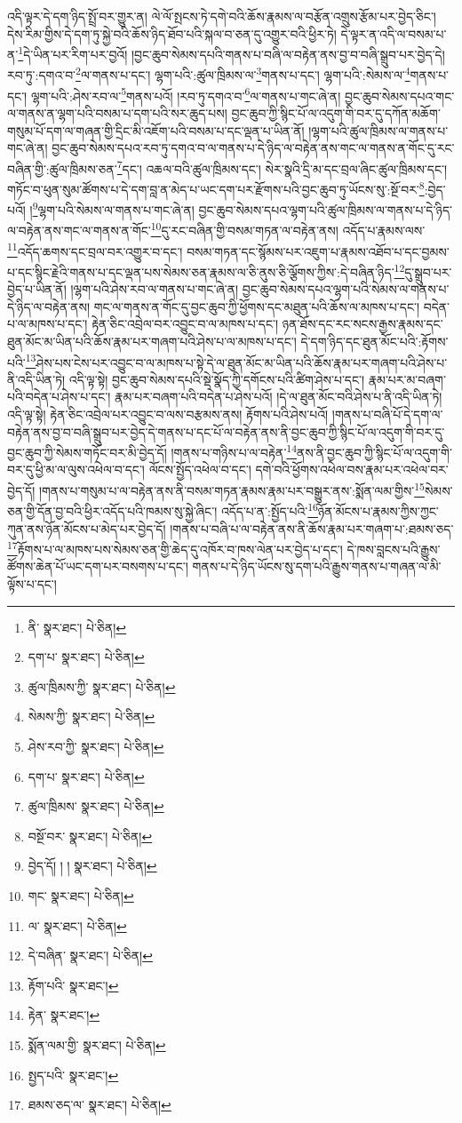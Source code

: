 འདི་ལྟར་དེ་དག་ཉིད་སྤྲོ་བར་གྱུར་ན། ལེ་ལོ་སྤངས་ཏེ་དགེ་བའི་ཆོས་རྣམས་ལ་བརྩོན་འགྲུས་རྩོམ་པར་བྱེད་ཅིང་། དེས་རིམ་གྱིས་དེ་དག་ཏུ་སྐྱེ་བའི་ཆོས་ཉིད་ཐོབ་པའི་སྐལ་བ་ཅན་དུ་འགྱུར་བའི་ཕྱིར་ཏེ། དེ་ལྟར་ན་འདི་ལ་བསམ་པ་ན་\footnote{ནི་  སྣར་ཐང་།  པེ་ཅིན། }དེ་ཡིན་པར་རིག་པར་བྱའོ། །བྱང་ཆུབ་སེམས་དཔའི་གནས་པ་བཞི་ལ་བརྟེན་ནས་བྱ་བ་བཞི་སྒྲུབ་པར་བྱེད་དེ། རབ་ཏུ་:དགའ་བ་\footnote{དག་པ་  སྣར་ཐང་།  པེ་ཅིན། }ལ་གནས་པ་དང་། ལྷག་པའི་:ཚུལ་ཁྲིམས་ལ་\footnote{ཚུལ་ཁྲིམས་ཀྱི་  སྣར་ཐང་།  པེ་ཅིན། }གནས་པ་དང་། ལྷག་པའི་:སེམས་ལ་\footnote{སེམས་ཀྱི་  སྣར་ཐང་།  པེ་ཅིན། }གནས་པ་དང་། ལྷག་པའི་:ཤེས་རབ་ལ་\footnote{ཤེས་རབ་ཀྱི་  སྣར་ཐང་།  པེ་ཅིན། }གནས་པའོ། །རབ་ཏུ་དགའ་བ་\footnote{དག་པ་  སྣར་ཐང་།  པེ་ཅིན། }ལ་གནས་པ་གང་ཞེ་ན། བྱང་ཆུབ་སེམས་དཔའ་གང་ལ་གནས་ན་ལྷག་པའི་བསམ་པ་དག་པའི་སར་ཆུད་པས། བྱང་ཆུབ་ཀྱི་སྙིང་པོ་ལ་འདུག་གི་བར་དུ་དཀོན་མཆོག་གསུམ་པོ་དག་ལ་གཞན་གྱི་དྲིང་མི་འཇོག་པའི་བསམ་པ་དང་ལྡན་པ་ཡིན་ནོ། །ལྷག་པའི་ཚུལ་ཁྲིམས་ལ་གནས་པ་གང་ཞེ་ན། བྱང་ཆུབ་སེམས་དཔའ་རབ་ཏུ་དགའ་བ་ལ་གནས་པ་དེ་ཉིད་ལ་བརྟེན་ནས་གང་ལ་གནས་ན་གོང་དུ་རང་བཞིན་གྱི་:ཚུལ་ཁྲིམས་ཅན་\footnote{ཚུལ་ཁྲིམས་  སྣར་ཐང་།  པེ་ཅིན། }དང་། འཆལ་བའི་ཚུལ་ཁྲིམས་དང་། སེར་སྣའི་དྲི་མ་དང་བྲལ་ཞིང་ཚུལ་ཁྲིམས་དང་། གཏོང་བ་ཕུན་སུམ་ཚོགས་པ་དེ་དག་བླ་ན་མེད་པ་ཡང་དག་པར་རྫོགས་པའི་བྱང་ཆུབ་ཏུ་ཡོངས་སུ་:སྔོ་བར་\footnote{བསྔོ་བར་  སྣར་ཐང་།  པེ་ཅིན། }:བྱེད་པའོ། །\footnote{བྱེད་དོ། ། །  སྣར་ཐང་།  པེ་ཅིན། }ལྷག་པའི་སེམས་ལ་གནས་པ་གང་ཞེ་ན། བྱང་ཆུབ་སེམས་དཔའ་ལྷག་པའི་ཚུལ་ཁྲིམས་ལ་གནས་པ་དེ་ཉིད་ལ་བརྟེན་ནས་གང་ལ་གནས་ན་གོང་\footnote{གང་  སྣར་ཐང་།  པེ་ཅིན། }དུ་རང་བཞིན་གྱི་བསམ་གཏན་ལ་བརྟེན་ནས། འདོད་པ་རྣམས་ལས་\footnote{ལ་  སྣར་ཐང་།  པེ་ཅིན། }འདོད་ཆགས་དང་བྲལ་བར་འགྱུར་བ་དང་། བསམ་གཏན་དང་སྙོམས་པར་འཇུག་པ་རྣམས་འཐོབ་པ་དང་བྱམས་པ་དང་སྙིང་རྗེའི་གནས་པ་དང་ལྡན་པས་སེམས་ཅན་རྣམས་ལ་ཅི་ནུས་ཅི་ལྕོགས་ཀྱིས་:དེ་བཞིན་ཉིད་\footnote{དེ་བཞིན་  སྣར་ཐང་།  པེ་ཅིན། }དུ་སྒྲུབ་པར་བྱེད་པ་ཡིན་ནོ། །ལྷག་པའི་ཤེས་རབ་ལ་གནས་པ་གང་ཞེ་ན། བྱང་ཆུབ་སེམས་དཔའ་ལྷག་པའི་སེམས་ལ་གནས་པ་དེ་ཉིད་ལ་བརྟེན་ནས། གང་ལ་གནས་ན་གོང་དུ་བྱང་ཆུབ་ཀྱི་ཕྱོགས་དང་མཐུན་པའི་ཆོས་ལ་མཁས་པ་དང་། བདེན་པ་ལ་མཁས་པ་དང་། རྟེན་ཅིང་འབྲེལ་བར་འབྱུང་བ་ལ་མཁས་པ་དང་། ཉན་ཐོས་དང་རང་སངས་རྒྱས་རྣམས་དང་ཐུན་མོང་མ་ཡིན་པའི་ཆོས་རྣམ་པར་གཞག་པའི་ཤེས་པ་ལ་མཁས་པ་དང་། དེ་དག་ཉིད་དང་ཐུན་མོང་པའི་:རྟོགས་པའི་\footnote{རྟོག་པའི་  སྣར་ཐང་། }ཤེས་པས་ངེས་པར་འབྱུང་བ་ལ་མཁས་པ་སྟེ་དེ་ལ་ཐུན་མོང་མ་ཡིན་པའི་ཆོས་རྣམ་པར་གཞག་པའི་ཤེས་པ་ནི་འདི་ཡིན་ཏེ། འདི་ལྟ་སྟེ། བྱང་ཆུབ་སེམས་དཔའི་སྡེ་སྣོད་ཀྱི་དགོངས་པའི་ཚིག་ཤེས་པ་དང་། རྣམ་པར་མ་བཞག་པའི་བདེན་པ་ཤེས་པ་དང་། རྣམ་པར་བཞག་པའི་བདེན་པ་ཤེས་པའོ། །དེ་ལ་ཐུན་མོང་བའི་ཤེས་པ་ནི་འདི་ཡིན་ཏེ། འདི་ལྟ་སྟེ། རྟེན་ཅིང་འབྲེལ་པར་འབྱུང་བ་ལས་བརྩམས་ནས། རྟོགས་པའི་ཤེས་པའོ། །གནས་པ་བཞི་པོ་དེ་དག་ལ་བརྟེན་ནས་བྱ་བ་བཞི་སྒྲུབ་པར་བྱེད་དེ་གནས་པ་དང་པོ་ལ་བརྟེན་ནས་ནི་བྱང་ཆུབ་ཀྱི་སྙིང་པོ་ལ་འདུག་གི་བར་དུ་བྱང་ཆུབ་ཀྱི་སེམས་གཏོང་བར་མི་བྱེད་དོ། །གནས་པ་གཉིས་པ་ལ་བརྟེན་\footnote{རྟེན་  སྣར་ཐང་། }ནས་ནི་བྱང་ཆུབ་ཀྱི་སྙིང་པོ་ལ་འདུག་གི་བར་དུ་ཕྱི་མ་ལ་ལུས་འཕེལ་བ་དང་། ལོངས་སྤྱོད་འཕེལ་བ་དང་། དགེ་བའི་ཕྱོགས་འཕེལ་བས་རྣམ་པར་འཕེལ་བར་བྱེད་དོ། །གནས་པ་གསུམ་པ་ལ་བརྟེན་ནས་ནི་བསམ་གཏན་རྣམས་རྣམ་པར་བསྒྱུར་ནས་:སྨོན་ལམ་གྱིས་\footnote{སྨོན་ལམ་གྱི་  སྣར་ཐང་།  པེ་ཅིན། }སེམས་ཅན་གྱི་དོན་བྱ་བའི་ཕྱིར་འདོད་པའི་ཁམས་སུ་སྐྱེ་ཞིང་། འདོད་པ་ན་:སྤྱོད་པའི་\footnote{སྤྱད་པའི་  སྣར་ཐང་། }ཉོན་མོངས་པ་རྣམས་ཀྱིས་ཀྱང་ཀུན་ནས་ཉོན་མོངས་པ་མེད་པར་བྱེད་དོ། །གནས་པ་བཞི་པ་ལ་བརྟེན་ནས་ནི་ཆོས་རྣམ་པར་གཞག་པ་:ཐམས་ཅད་\footnote{ཐམས་ཅད་ལ་  སྣར་ཐང་།  པེ་ཅིན། }རྟོགས་པ་ལ་མཁས་པས་སེམས་ཅན་གྱི་ཆེད་དུ་འཁོར་བ་ཁས་ལེན་པར་བྱེད་པ་དང་། དེ་ཁས་བླངས་པའི་རྒྱུས་ཚོགས་ཆེན་པོ་ཡང་དག་པར་བསགས་པ་དང་། གནས་པ་དེ་ཉིད་ཡོངས་སུ་དག་པའི་རྒྱུས་གནས་པ་གཞན་ལ་མི་ལྟོས་པ་དང་། 
